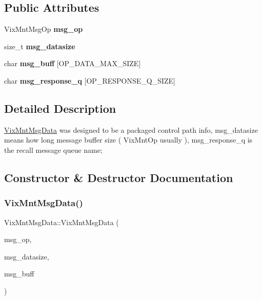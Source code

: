 \subsection*{Public Attributes}
\begin{DoxyCompactItemize}
\item 
\hypertarget{class_vix_mnt_msg_data_ad4b59388ef4ad020356ad0c489f479c2}{}\label{class_vix_mnt_msg_data_ad4b59388ef4ad020356ad0c489f479c2} 
Vix\+Mnt\+Msg\+Op {\bfseries msg\+\_\+op}
\item 
\hypertarget{class_vix_mnt_msg_data_abb6e240f5a6806c15df6ed2e5f7d7d01}{}\label{class_vix_mnt_msg_data_abb6e240f5a6806c15df6ed2e5f7d7d01} 
size\+\_\+t {\bfseries msg\+\_\+datasize}
\item 
\hypertarget{class_vix_mnt_msg_data_a00ae6520116b6acd068793521d507787}{}\label{class_vix_mnt_msg_data_a00ae6520116b6acd068793521d507787} 
char {\bfseries msg\+\_\+buff} \mbox{[}O\+P\+\_\+\+D\+A\+T\+A\+\_\+\+M\+A\+X\+\_\+\+S\+I\+ZE\mbox{]}
\item 
\hypertarget{class_vix_mnt_msg_data_a8524bd9fd87c950f2a8e4937f0d8f92d}{}\label{class_vix_mnt_msg_data_a8524bd9fd87c950f2a8e4937f0d8f92d} 
char {\bfseries msg\+\_\+response\+\_\+q} \mbox{[}O\+P\+\_\+\+R\+E\+S\+P\+O\+N\+S\+E\+\_\+\+Q\+\_\+\+S\+I\+ZE\mbox{]}
\end{DoxyCompactItemize}


\subsection{Detailed Description}
\hyperlink{class_vix_mnt_msg_data}{Vix\+Mnt\+Msg\+Data} was designed to be a packaged control path info, msg\+\_\+datasize means how long message buffer size ( Vix\+Mnt\+Op usually ), msg\+\_\+response\+\_\+q is the recall message queue name; 

\subsection{Constructor \& Destructor Documentation}
\hypertarget{class_vix_mnt_msg_data_a80cb5c90791e78df8df6d0968667a731}{}\label{class_vix_mnt_msg_data_a80cb5c90791e78df8df6d0968667a731} 
\subsubsection{\texorpdfstring{Vix\+Mnt\+Msg\+Data()}{VixMntMsgData()}\hspace{0.1cm}{\footnotesize\ttfamily [1/3]}}
{\ttfamily Vix\+Mnt\+Msg\+Data\+::\+Vix\+Mnt\+Msg\+Data (\begin{DoxyParamCaption}\item[{Vix\+Mnt\+Msg\+Op}]{msg\+\_\+op,  }\item[{size\+\_\+t}]{msg\+\_\+datasize,  }\item[{char $\ast$}]{msg\+\_\+buff }\end{DoxyParamCaption})}



